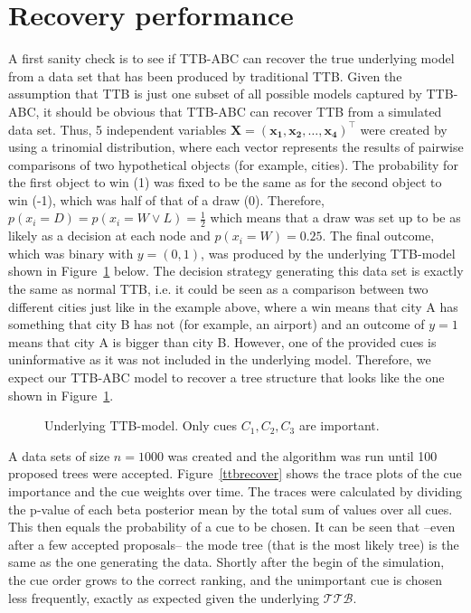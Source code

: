 \documentclass[a4paper,man, natbib]{apa6}
\begin{document}

\section{Recovery performance}
A first sanity check is to see if TTB-ABC can recover the true underlying model from a data set that has been produced by traditional TTB. Given the assumption that  TTB is just one subset of all possible models captured by  TTB-ABC, it should be obvious that TTB-ABC can recover TTB from a simulated data set. Thus, 5 independent variables $\mathbf{X=(x_1,x_2, \dots, x_4)}^\top$ were created by using a trinomial distribution, where each vector represents the results of pairwise comparisons of two hypothetical objects (for example, cities). The probability for the first object to win (1) was fixed to be the same as for the second object to win (-1), which was half of that of a draw (0). Therefore, $p(x_i=D)=p(x_i=W \lor L)=\frac{1}{2}$ which means that a draw was set up to be as likely as a decision at each node and $p(x_i=W)=0.25$. The final outcome, which was binary with $y=(0,1)$, was produced by the underlying TTB-model shown in Figure~\ref{fig:ttbtruth} below. The decision strategy generating this data set is exactly the same as normal TTB, i.e. it could be seen as a comparison between two different cities just like in the example above, where a win means that city A has something that city B has not (for example, an airport) and an outcome of $y=1$ means that city A is bigger than city B. However, one of the provided cues is uninformative as it was not included in the underlying model. Therefore, we expect our TTB-ABC model to recover a tree structure that looks like the one shown in Figure~\ref{fig:ttbtruth}.

\FloatBarrier
\begin{figure}
\caption{Underlying TTB-model. Only cues $C_1, C_2,C_3$ are important.}
\label{fig:ttbtruth}
\begin{center}

\end{center}
\end{figure}
\FloatBarrier

A data sets of size $n=1000$ was created and the algorithm was run until 100 proposed trees were accepted. Figure~\ref{ttbrecover} shows the trace plots of the cue importance and the cue weights over time. The traces were calculated by dividing the p-value of each beta posterior mean by the total sum of values over all cues. This then equals the probability of a cue to be chosen. It can be seen that --even after a few accepted proposals-- the mode tree (that is the most likely tree) is the same as the one generating the data. Shortly after the begin of the simulation, the cue order grows to the correct ranking, and the unimportant cue is chosen less frequently, exactly as expected given the underlying $\mathcal{TTB}$.
\end{document}
